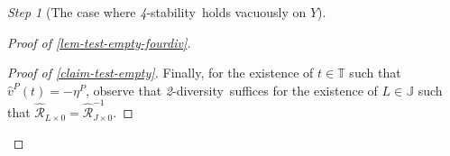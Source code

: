 \documentclass[ecta,nameyear,draft]{econsocart}
\newcommand{\R}{\mathbb R}
\newcommand{\novel}{\mathfrak f}
\newcommand{\hext}{\mathrel{\hat{\mathrel{\mathcal R}}}}
\newcommand{\aext}{\mathrel{\acute{\mathrel{\mathcal R}}}}
\newcommand{\aextb}{\mathbin{\acute{\mathbin{\mathcal R}}}}
\newcommand{\mbbc}{{\mathds C}}
\newcommand{\mbbt}{{\mathds {T}}}
\newcommand{\mbbj}{\mathds J}
\newcommand{\xy}{{(x, y)}}
\newcommand{\stability}{\textit{4}-\textup{{stability}}}
\newcommand{\twodiv}{\textit{2}-\textup{diversity}}
\theoremstyle{plain}
\theoremstyle{remark}
\newtheorem{step}{Step}[section]
\begin{document}
\begin{appendix}
\begin{step}[The case where \stability\ holds vacuously on $Y$]
\begin{proof}[Proof of \cref{lem-test-empty-fourdiv}]
\begin{proof}[Proof of \cref{claim-test-empty}]
        Finally, for the existence of $t\in\mbbt$ such that $\hat{v}^{P}(t) =
        -\eta^{P}$, observe that \twodiv\ suffices for the existence of $L \in
        \mbbj$ such that $\hext_{L\times 0} = \hext_{J\times 0}^{-1}$.
      \end{proof}


\end{proof}
\end{step}
\end{appendix}
\end{document}
